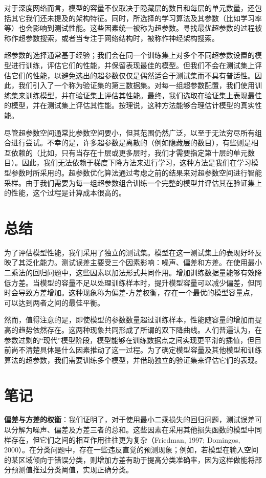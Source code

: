 \documentclass[lang=cn,newtx,10pt,scheme=chinese]{elegantbook}
\begin{document}
对于深度网络而言，模型的容量不仅取决于隐藏层的数目和每层的单元数量，还包括其它我们还未提及的架构特征。同时，所选择的学习算法及其参数（比如学习率等）也会影响到测试性能。这些因素统一被称为超参数。寻找最优超参数的过程被称作超参数搜索，或者当专注于网络结构时，被称作神经架构搜索。

超参数的选择通常基于经验；我们会在同一个训练集上对多个不同超参数设置的模型进行训练，评估它们的性能，并保留表现最佳的模型。但我们不会在测试集上评估它们的性能，以避免选出的超参数仅仅是偶然适合于测试集而不具有普适性。因此，我们引入了一个称为验证集的第三数据集。对每一组超参数配置，我们使用训练集来训练模型，并在验证集上评估其性能。最终，我们选取在验证集上表现最佳的模型，并在测试集上评估其性能。按理说，这种方法能够合理估计模型的真实性能。

尽管超参数空间通常比参数空间要小，但其范围仍然广泛，以至于无法穷尽所有组合进行尝试。不幸的是，许多超参数是离散的（例如隐藏层的数目），有些则是相互依赖的（比如，只有当存在十层或更多层时，我们才需要指定第十层的单元数目）。因此，我们无法依赖于梯度下降方法来进行学习，这种方法是我们在学习模型参数时所采用的。超参数优化算法通过考虑之前的结果来对超参数空间进行智能采样。由于我们需要为每一组超参数组合训练一个完整的模型并评估其在验证集上的性能，这个过程是计算成本很高的。
\section{总结}

为了评估模型性能，我们采用了独立的测试集。模型在这一测试集上的表现好坏反映了其泛化能力。测试误差主要受三个因素影响：噪声、偏差和方差。在使用最小二乘法的回归问题中，这些因素以加法形式共同作用。增加训练数据量能够有效降低方差。当模型的容量不足以处理训练样本时，提升模型容量可以减少偏差，但同时会导致方差增加。这种现象称为偏差-方差权衡，存在一个最优的模型容量点，可以达到两者之间的最佳平衡。

然而，值得注意的是，即使模型的参数数量超过训练样本，性能随容量的增加而提高的趋势依然存在。这两种现象共同形成了所谓的双下降曲线。人们普遍认为，在参数过剩的“现代”模型阶段，模型能够在训练数据点之间实现更平滑的插值，但目前尚不清楚具体是什么因素推动了这一过程。为了确定模型容量及其他模型和训练算法的超参数，我们需要训练多个模型，并借助独立的验证集来评估它们的表现。
\section{笔记}
\textbf{偏差与方差的权衡}：我们证明了，对于使用最小二乘损失的回归问题，测试误差可以分解为噪声、偏差及方差三者的总和。这些因素在采用其他损失函数的模型中同样存在，但它们之间的相互作用往往更为复杂（Friedman, 1997; Domingos, 2000）。在分类问题中，存在一些违反直觉的预测现象；例如，若模型在输入空间的某区域倾向于错误分类，则增加方差有助于提高分类准确率，因为这样做能将部分预测值推过分类阈值，实现正确分类。
\end{document}
